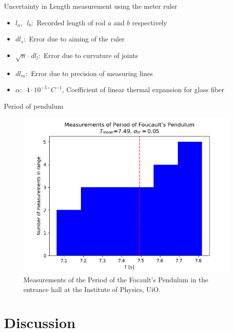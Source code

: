 \documentclass[11pt,a4paper]{article}
\begin{document}
  \begin{table}[H]
    \center
    \caption{Uncertainty in Length measurement using the meter ruler}
    \label{tab:uncert}
    
  \end{table}
  
  \begin{itemize}
    \item $l_a, \enspace l_b:$ Recorded length of rod $a$ and $b$ respectively
    \item $dl_s:$ Error due to aiming of the ruler
    \item $\sqrt n \cdot dl_l:$ Error due to curvature of joints
    \item $dl_m:$ Error due to precision of measuring lines
    \item $\alpha :\enspace 4\cdot10^{-5\circ} C^{-1}$, Coefficient of linear thermal expansion for glass fiber
  \end{itemize}
  
  \begin{table}[H]
    \center
    \caption{Period of pendulum}
    \label{tab:pendel}
    
  \end{table}
  \begin{figure}[H]
    \center
    \includegraphics[scale=0.7]{scripts/figs/period.png}
    \caption{Measurements of the Period of the Focault's Pendulum in the entrance hall at the Institute of Physics, UiO.}
    \label{fig:pendel}
  \end{figure}


\section{\label{sec:disc}Discussion}
\end{document}

